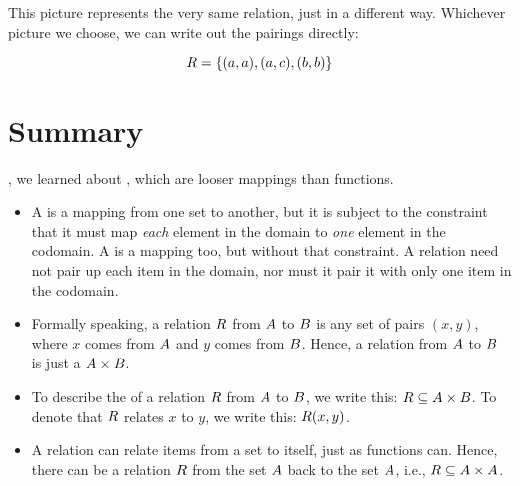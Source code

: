 \documentclass[../../../main.tex]{subfiles}
\begin{document}
This picture represents the very same relation, just in a different way. Whichever picture we choose, we can write out the pairings directly:

\begin{equation*}
  R = \{ (a, a), (a, c), (b, b) \}
\end{equation*}


\section{Summary}

, we learned about , which are looser mappings than functions. 

\begin{itemize}

  \item A  is a mapping from one set to another, but it is subject to the constraint that it must map \emph{each} element in the domain to \emph{one} element in the codomain. A  is a mapping too, but without that constraint. A relation need not pair up each item in the domain, nor must it pair it with only one item in the codomain.
  
  \item Formally speaking, a relation $R$ from $A$ to $B$ is any set of pairs $(x, y)$, where $x$ comes from $A$ and $y$ comes from $B$. Hence, a relation from $A$ to $B$ is just a  $A \times B$.
  
  \item To describe the  of a relation $R$ from $A$ to $B$, we write this: $R \subseteq A \times B$. To denote that $R$ relates $x$ to $y$, we write this: $R(x, y)$. 
  
  \item A relation can relate items from a set to itself, just as functions can. Hence, there can be a relation $R$ from the set $A$ back to the set $A$, i.e., $R \subseteq A \times A$.

\end{itemize}
\end{document}
